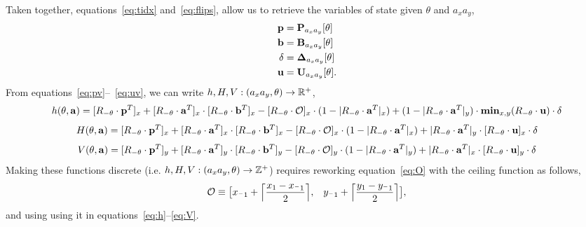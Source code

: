 Taken together, equations~\ref{eq:tidx} and~\ref{eq:flips}, allow us to retrieve the variables
 of state given $\theta$ and $a_xa_y$,
\begin{eqnarray}
    \mathbf{p} &= \mathbf{P}_{a_xa_y}[\theta] \label{eq:pv} \\
    \mathbf{b} &= \mathbf{B}_{a_xa_y}[\theta]\\
    \delta &= \mathbf{\Delta}_{a_xa_y}[\theta]\\
    \mathbf{u} &= \mathbf{U}_{a_xa_y}[\theta]. \label{eq:uv}
\end{eqnarray}
From equations~\ref{eq:pv}--~\ref{eq:uv}, we can write $h,H,V: (a_xa_y,\theta) \rightarrow \mathbb{R}^+$,
\begin{equation}
    h(\theta,\av) = [\rnt \cdot \pv^T]_x + [\rnt \cdot \av^T]_x \cdot [\rnt \cdot \bv^T]_x -
    [\rnt \cdot \orig]_x \cdot (1 - |\rnt \cdot \av^T|_x) +
    (1 - |\rnt \cdot \av^T|_y) \cdot \mathbf{min}_{x,y}(\rnt \cdot \uv ) \cdot \delta
    \label{eq:h}
\end{equation}
\begin{equation}
    H(\theta,\av) = [\rnt \cdot \pv^T]_x + [\rnt \cdot \av^T]_x \cdot [\rnt \cdot \bv^T]_x -
    [\rnt \cdot \orig]_x \cdot (1 - |\rnt \cdot \av^T|_x) +
    |\rnt \cdot \av^T|_y \cdot [\rnt \cdot \uv ]_x \cdot \delta
    \label{eq:H}
\end{equation}
\begin{equation}
    V(\theta,\av) = [\rnt \cdot \pv^T]_y + [\rnt \cdot \av^T]_y \cdot [\rnt \cdot \bv^T]_y -
    [\rnt \cdot \orig]_y \cdot (1 - |\rnt \cdot \av^T|_y) +
    |\rnt \cdot \av^T|_x \cdot [\rnt \cdot \uv ]_y \cdot \delta
    \label{eq:V}
\end{equation}
Making these functions discrete (i.e. $h,H,V: (a_xa_y,\theta) \rightarrow \mathbb{Z}^+$)
requires reworking equation~\ref{eq:O} with the ceiling function as follows,
\begin{equation}
    \mathcal{O} \equiv \bigl[x_{^-1} + \ceil[\Big]{\frac{x_1 - x_{^-1}}{2}}, \;\;\;
                             y_{^-1} + \ceil[\Big]{\frac{y_1 - y_{^-1}}{2}} \bigl],
    \label{eq:discreteO}
\end{equation}
and using using it in equations~\eqref{eq:h}--\eqref{eq:V}.

